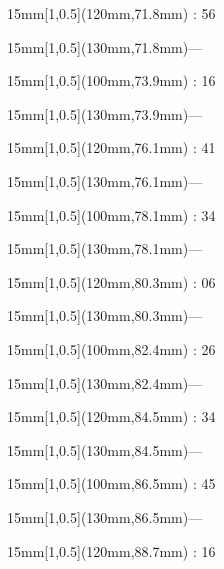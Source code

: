 \documentclass[a4paper]{memoir}
\begin{document}
\begin{textblock*}{15mm}[1,0.5](120mm,71.8mm) : 56\end{textblock*}
\begin{textblock*}{15mm}[1,0.5](130mm,71.8mm)\flushright —\end{textblock*}
\begin{textblock*}{15mm}[1,0.5](100mm,73.9mm) : 16\end{textblock*}
\begin{textblock*}{15mm}[1,0.5](130mm,73.9mm)\flushright —\end{textblock*}
\begin{textblock*}{15mm}[1,0.5](120mm,76.1mm) : 41\end{textblock*}
\begin{textblock*}{15mm}[1,0.5](130mm,76.1mm)\flushright —\end{textblock*}
\begin{textblock*}{15mm}[1,0.5](100mm,78.1mm) : 34\end{textblock*}
\begin{textblock*}{15mm}[1,0.5](130mm,78.1mm)\flushright —\end{textblock*}
\begin{textblock*}{15mm}[1,0.5](120mm,80.3mm) : 06\end{textblock*}
\begin{textblock*}{15mm}[1,0.5](130mm,80.3mm)\flushright —\end{textblock*}
\begin{textblock*}{15mm}[1,0.5](100mm,82.4mm) : 26\end{textblock*}
\begin{textblock*}{15mm}[1,0.5](130mm,82.4mm)\flushright —\end{textblock*}
\begin{textblock*}{15mm}[1,0.5](120mm,84.5mm) : 34\end{textblock*}
\begin{textblock*}{15mm}[1,0.5](130mm,84.5mm)\flushright —\end{textblock*}
\begin{textblock*}{15mm}[1,0.5](100mm,86.5mm) : 45\end{textblock*}
\begin{textblock*}{15mm}[1,0.5](130mm,86.5mm)\flushright —\end{textblock*}
\begin{textblock*}{15mm}[1,0.5](120mm,88.7mm) : 16\end{textblock*}
\end{document}
